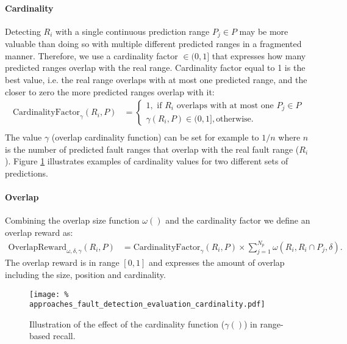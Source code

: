 \paragraph{Cardinality}
Detecting $R_i$ with a single continuous prediction range $P_j \in  P$ may be more valuable than doing so with multiple different predicted ranges in a fragmented manner.
Therefore, we use a cardinality factor $\in (0, 1]$ that expresses how many predicted ranges overlap with the real range.
Cardinality factor equal to 1 is the best value, i.e. the real range overlaps with at most one predicted range, and the closer to zero the more predicted ranges overlap with it:
\begin{align*}
    \text{CardinalityFactor}_\gamma(R_i, P) &= \begin{cases}
        1, \text{ if } R_i \text{ overlaps with at most one } P_j \in P \\
        \gamma(R_i, P) \in (0, 1], \text{otherwise}.
    \end{cases}\\
\end{align*}
The value $\gamma$ (overlap cardinality function) can be set for example to $1/n$ where $n$ is the number of predicted fault ranges that overlap with the real fault range ($R_i$).
Figure \ref{fig:approaches_fault_detection_evaluation_cardinality} illustrates examples of cardinality values for two different sets of predictions.

\paragraph{Overlap}
Combining the overlap size function $\omega()$ and the cardinality factor we define an overlap reward as:
\begin{align*}
    \text{OverlapReward}_{\omega, \delta, \gamma}(R_i, P) &= \text{CardinalityFactor}_\gamma(R_i, P) \times \sum_{j=1}^{N_p}\omega(R_i, R_i \cap P_j, \delta).
\end{align*}
The overlap reward is in range $[0, 1]$ and expresses the amount of overlap including the size, position and cardinality.

\begin{figure}
    \centering
    \texttt{[image: \%
        approaches\_fault\_detection\_evaluation\_cardinality.pdf]}
    \caption{Illustration of the effect of the cardinality function ($\gamma()$) in range-based recall.}
    \label{fig:approaches_fault_detection_evaluation_cardinality}
    \centering
\end{figure}

